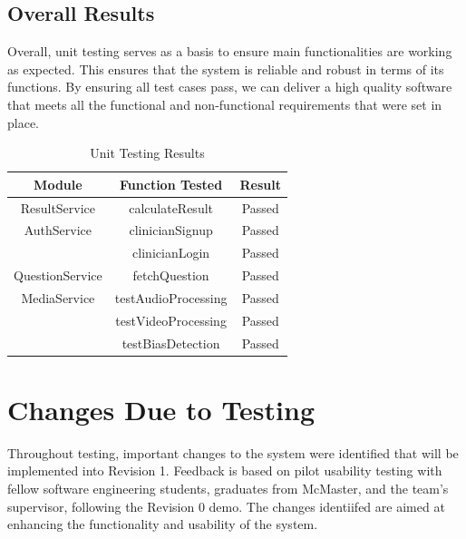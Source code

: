 \documentclass[12pt, titlepage]{article}
\begin{document}
\newpage{}

  \subsection{Overall Results}

  \hspace{2em}Overall, unit testing serves as a basis to ensure main functionalities are working as expected. This ensures that the system is reliable and robust in terms of its 
  functions. By ensuring all test cases pass, we can deliver a high quality software that meets all the functional and non-functional requirements that were set in place. 

  \begin{table}[H]
    \centering
    \label{tab:unitTestingResults}
    \begin{tabular}{|c|c|c|}
      \hline
      \textbf{Module} & \textbf{Function Tested} & \textbf{Result} \\
      \hline
      ResultService & calculateResult & Passed \\
      \hline
      AuthService & clinicianSignup & Passed \\      
                  & clinicianLogin & Passed \\ 
      \hline
      QuestionService & fetchQuestion & Passed \\
      \hline
      MediaService & testAudioProcessing & Passed \\
                   & testVideoProcessing & Passed \\
                   & testBiasDetection & Passed \\
      \hline
    \end{tabular}
    \caption{Unit Testing Results}
\end{table}

\newpage{}

\section{Changes Due to Testing}

\hspace{2em} Throughout testing, important changes to the system were identified that will be implemented into Revision 1.
Feedback is based on pilot usability testing with fellow software engineering students, graduates from McMaster, and the team's
supervisor, following the Revision 0 demo. The changes identiifed are aimed at enhancing the functionality and usability of the system.
\end{document}
